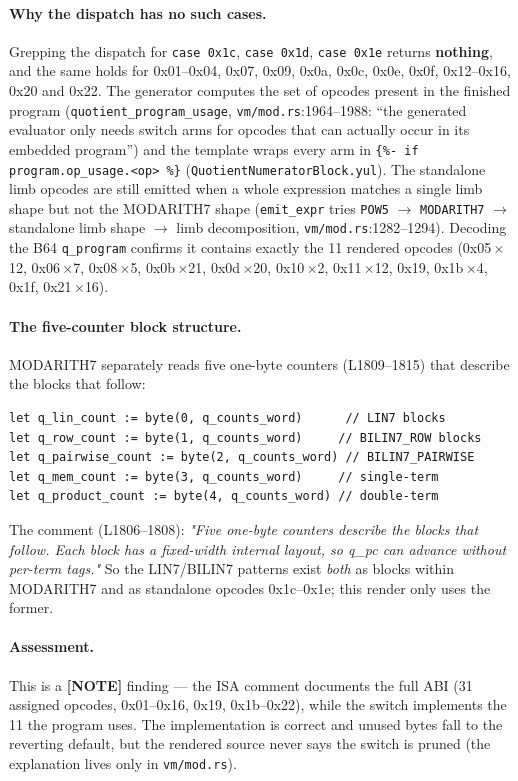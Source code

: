 \paragraph{Why the dispatch has no such cases.} Grepping the
dispatch for \texttt{case 0x1c}, \texttt{case 0x1d}, \texttt{case
0x1e} returns \textbf{nothing}, and the same holds for 0x01--0x04,
0x07, 0x09, 0x0a, 0x0c, 0x0e, 0x0f, 0x12--0x16, 0x20 and 0x22.
The generator computes the set of opcodes present in the finished
program (\texttt{quotient\_\allowbreak{}program\_\allowbreak{}usage}, \texttt{vm/mod.rs}:1964--1988:
``the generated evaluator only needs switch arms for opcodes that
can actually occur in its embedded program'') and the template
wraps every arm in \texttt{\{\%- if program.op\_\allowbreak{}usage.<op> \%\}}
(\texttt{QuotientNumeratorBlock.yul}). The standalone limb opcodes
are still emitted when a whole expression matches a single limb
shape but not the MODARITH7 shape (\texttt{emit\_expr} tries
\texttt{POW5} $\to$ \texttt{MODARITH7} $\to$ standalone limb shape
$\to$ limb decomposition, \texttt{vm/mod.rs}:1282--1294). Decoding
the B64 \texttt{q\_program} confirms it contains exactly the 11
rendered opcodes (0x05\,$\times$12, 0x06\,$\times$7,
0x08\,$\times$5, 0x0b\,$\times$21, 0x0d\,$\times$20,
0x10\,$\times$2, 0x11\,$\times$12, 0x19, 0x1b\,$\times$4, 0x1f,
0x21\,$\times$16).

\paragraph{The five-counter block structure.} MODARITH7
separately reads five one-byte counters (L1809--1815) that
describe the blocks that follow:
\begin{lstlisting}[style=yul]
let q_lin_count := byte(0, q_counts_word)      // LIN7 blocks
let q_row_count := byte(1, q_counts_word)     // BILIN7_ROW blocks
let q_pairwise_count := byte(2, q_counts_word) // BILIN7_PAIRWISE
let q_mem_count := byte(3, q_counts_word)     // single-term
let q_product_count := byte(4, q_counts_word) // double-term
\end{lstlisting}
The comment (L1806--1808): \emph{"Five one-byte counters describe
the blocks that follow. Each block has a fixed-width internal
layout, so q\_pc can advance without per-term tags."} So the
LIN7/BILIN7 patterns exist \emph{both} as blocks within MODARITH7
and as standalone opcodes 0x1c--0x1e; this render only uses the
former.

\paragraph{Assessment.} This is a
\textcolor{mathpurple}{\textbf{[NOTE]}} finding --- the ISA
comment documents the full ABI (31 assigned opcodes, 0x01--0x16,
0x19, 0x1b--0x22), while the switch implements the 11 the program
uses. The implementation is correct and unused bytes fall to the
reverting default, but the rendered source never says the switch
is pruned (the explanation lives only in \texttt{vm/mod.rs}).

